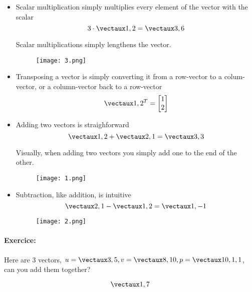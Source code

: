 \documentclass{article}
\begin{document}
\begin{itemize}
\item \color{rooj}  Scalar multiplication \color{black} simply multiplies every element of the vector with the scalar
\[
3 \cdot \vect{1 , 2} = \vect{3 , 6}
\]

\begin{minipage}{0.45\textwidth}
\begin{flushleft}
Scalar multiplications simply lengthens the vector. 
\end{flushleft}
\end{minipage} \hfill
\begin{minipage}{0.45\textwidth}
\begin{figure}[H]
\texttt{[image: 3.png]}
\end{figure}
\end{minipage}
\item

 \color{pers} Transposing \color{black} a vector is simply converting it from a row-vector to a colum-vector, or a column-vector back to a row-vector
\[
\vect{1 , 2}^T = \icol{1 \\ 2}
\]

\item \color{groen} Adding \color{black} two vectors is straighforward 
\[
\vect{1 , 2} + \vect{2 , 1} = \vect{3  , 3}
\]

\begin{minipage}{0.45\textwidth}
Visually, when adding two vectors you simply add one to the end of the other.
\end{minipage} \hfill
\begin{minipage}{0.45\textwidth}
\begin{figure}[H]
\texttt{[image: 1.png]}
\end{figure}
\end{minipage}

\item \color{blou} Subtraction\color{black}, like addition, is intuitive
\[
\vect{2 , 1} - \vect{1  , 2} = \vect{1 , -1}
\]

\begin{minipage}{0.45\textwidth}

\end{minipage} \hfill
\begin{minipage}{0.45\textwidth}
\begin{flushleft}
\begin{figure}[H]
\texttt{[image: 2.png]}
\end{figure}
\end{flushleft}
\end{minipage}

\end{itemize}

\paragraph{Exercice: } 
Here are 3 vectors, $u = \vect{3 , 5}, v = \vect{8 , 10}, p = \vect{10, 1, 1}$, can you add them together?

\[
\vect{1, 7} 
\] 
\end{document}
